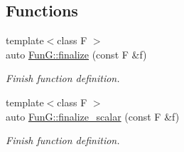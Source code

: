 \subsection*{Functions}
\begin{DoxyCompactItemize}
\item 
{\footnotesize template$<$class F $>$ }\\auto \hyperlink{namespaceFunG_a3a2af76439713dc7635e0c538ac34f15}{Fun\+G\+::finalize} (const F \&f)
\begin{DoxyCompactList}\small\item\em Finish function definition. \end{DoxyCompactList}\item 
{\footnotesize template$<$class F $>$ }\\auto \hyperlink{namespaceFunG_a0c224cd9b212427657c6798ac8adf6ac}{Fun\+G\+::finalize\+\_\+scalar} (const F \&f)
\begin{DoxyCompactList}\small\item\em Finish function definition. \end{DoxyCompactList}\end{DoxyCompactItemize}
